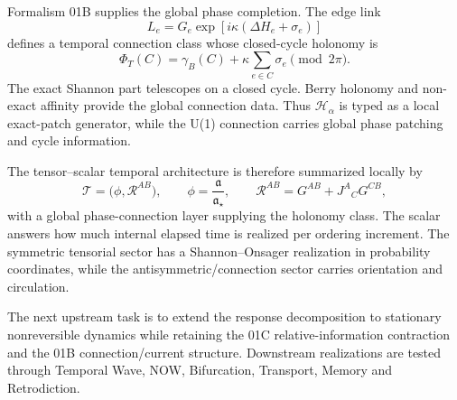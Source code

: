 \documentclass[11pt]{book}
\begin{document}
Formalism 01B supplies the global phase completion. The edge link
\[
L_e=G_e\exp\!\left[i\kappa(\Delta H_e+\sigma_e)\right]
\]
defines a temporal connection class whose closed-cycle holonomy is
\[
\boxed{
\Phi_T(C)=\gamma_B(C)+\kappa\sum_{e\in C}\sigma_e\pmod{2\pi}.
}
\]
The exact Shannon part telescopes on a closed cycle. Berry holonomy and non-exact affinity provide the global connection data. Thus \(\mathcal H_\alpha\) is typed as a local exact-patch generator, while the U(1) connection carries global phase patching and cycle information.

The tensor--scalar temporal architecture is therefore summarized locally by
\[
\boxed{
\mathcal T
=\bigl(\phi,\mathcal R^{AB}\bigr),
\qquad
\phi=\frac{\mathfrak a}{\mathfrak a_\star},
\qquad
\mathcal R^{AB}=G^{AB}+J^A{}_{C}G^{CB},
}
\]
with a global phase-connection layer supplying the holonomy class. The scalar answers how much internal elapsed time is realized per ordering increment. The symmetric tensorial sector has a Shannon--Onsager realization in probability coordinates, while the antisymmetric/connection sector carries orientation and circulation.

The next upstream task is to extend the response decomposition to stationary nonreversible dynamics while retaining the 01C relative-information contraction and the 01B connection/current structure. Downstream realizations are tested through Temporal Wave, NOW, Bifurcation, Transport, Memory and Retrodiction.
\end{document}

